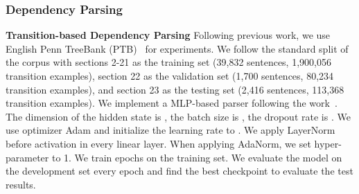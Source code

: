 \documentclass{article}
\begin{document}
\subsubsection{Dependency Parsing}
\textbf{Transition-based Dependency Parsing} Following previous work, we use English Penn TreeBank (PTB)~\citep{DBLP:journals/coling/MarcusSM94} for experiments. We follow the standard split of the corpus with sections 2-21 as the training set (39,832 sentences, 1,900,056 transition examples), section 22 as the validation set (1,700 sentences, 80,234 transition examples), and section 23 as the testing set (2,416 sentences, 113,368 transition examples). We implement a  MLP-based parser following the work~\citep{DBLP:conf/emnlp/ChenM14}.   The dimension of the hidden state is , the batch size is , the dropout rate is . We use optimizer Adam and initialize the learning rate to . We apply LayerNorm before activation in every linear layer. When applying AdaNorm, we set hyper-parameter  to 1. We train  epochs on the training set. We evaluate the model on the development set every epoch and find the best checkpoint to evaluate the test results.




\clearpage
\end{document}
